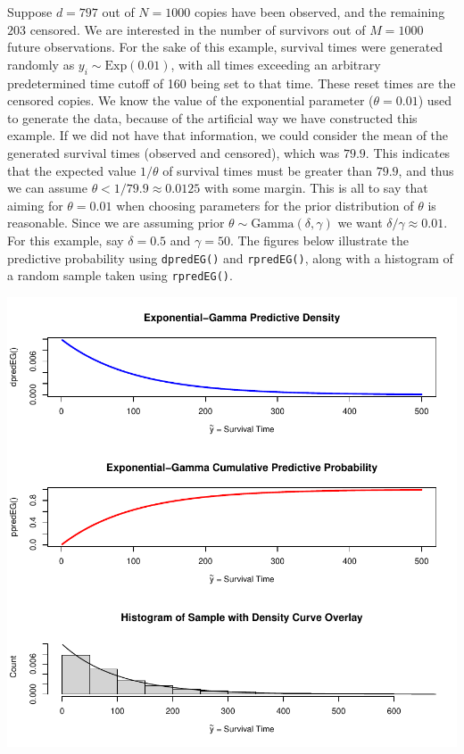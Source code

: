 \documentclass[12pt, a4paper]{article}
\begin{document}
\noindent Suppose $d=797$ out of $N = 1000$ copies have been observed, and the remaining $203$ censored. We are interested in the number of survivors out of $M = 1000$ future observations.  For the sake of this example, survival times were generated randomly as $y_i \sim \text{Exp}(0.01)$, with all times exceeding an arbitrary predetermined time cutoff of 160 being set to that time.  These reset times are the censored copies.  We know the value of the exponential parameter ($\theta = 0.01$) used to generate the data, because of the artificial way we have constructed this example.  If we did not have that information, we could consider the mean of the generated survival times (observed and censored), which was $79.9$.  This indicates that the expected value $1/\theta$ of survival times must be greater than $79.9$, and thus we can assume $\theta < 1/79.9 \approx 0.0125$ with some margin.  This is all to say that aiming for $\theta = 0.01$ when choosing parameters for the prior distribution of $\theta$ is reasonable.  Since we are assuming prior $\theta\sim\text{Gamma}(\delta,\gamma)$ we want $\delta/\gamma \approx 0.01$.   For this example, say $\delta = 0.5$ and $\gamma=50$.  The figures below illustrate the predictive probability using \texttt{dpredEG()} and \texttt{rpredEG()}, along with a histogram of a random sample taken using \texttt{rpredEG()}.



\includegraphics{Thesis_v4-004}
\end{document}
